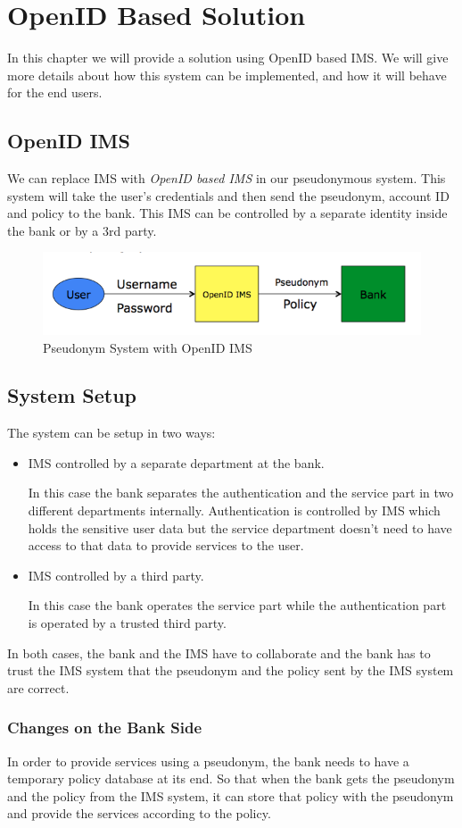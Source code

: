 \chapter{OpenID Based Solution}
In this chapter we will provide a solution using OpenID based IMS. We will give more details about how this system can be implemented, and how it will behave for the end users.
\section{OpenID IMS}
We can replace IMS with \textit{OpenID based IMS} in our pseudonymous system. This system will take the user's credentials and then send the pseudonym, account ID and policy to the bank. This IMS can be controlled by a separate identity inside the bank or by a 3rd party.
\begin{figure}[h]
	\centering
	\includegraphics[width=\textwidth]{figures/OpenID}
	\caption{Pseudonym System with OpenID IMS}
	\label{fig:OpenID}
\end{figure}
\section{System Setup}
The system can be setup in two ways:
\begin{itemize}
	\item IMS controlled by a separate department at the bank.
	
	In this case the bank separates the authentication and the service part in two different departments internally. Authentication is controlled by IMS which holds the sensitive user data but the service department doesn't need to have access to that data to provide services to the user.
	\item IMS controlled by a third party.
	
	In this case the bank operates the service part while the authentication part is operated by a trusted third party.
\end{itemize}
In both cases, the bank and the IMS have to collaborate and the bank has to trust the IMS system that the pseudonym and the policy sent by the IMS system are correct.
\subsection{Changes on the Bank Side}
In order to provide services using a pseudonym, the bank needs to have a temporary policy database at its end. So that when the bank gets the pseudonym and the policy from the IMS system, it can store that policy with the pseudonym and provide the services according to the policy.
